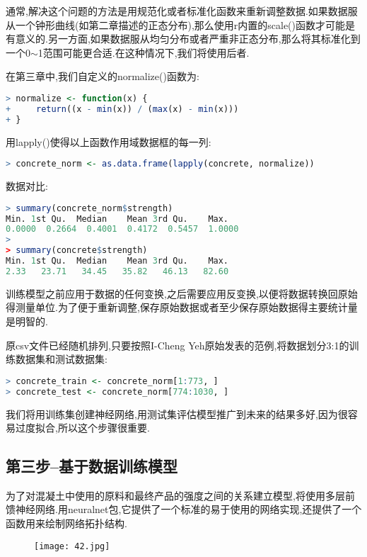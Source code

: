 \documentclass[11pt,a4paper,oneside]{book}
\begin{document}
通常,解决这个问题的方法是用规范化或者标准化函数来重新调整数据.如果数据服从一个钟形曲线(如第二章描述的正态分布),那么使用r内置的scale()函数才可能是有意义的.另一方面,如果数据服从均匀分布或者严重非正态分布,那么将其标准化到一个0$\sim$1范围可能更合适.在这种情况下,我们将使用后者.

在第三章中,我们自定义的normalize()函数为:
\begin{lstlisting}[language=r]
> normalize <- function(x) { 
+     return((x - min(x)) / (max(x) - min(x)))
+ }
\end{lstlisting}
用lapply()使得以上函数作用域数据框的每一列:
\begin{lstlisting}[language=r]
> concrete_norm <- as.data.frame(lapply(concrete, normalize))
\end{lstlisting}
数据对比:
\begin{lstlisting}[language=r]
> summary(concrete_norm$strength)
Min. 1st Qu.  Median    Mean 3rd Qu.    Max. 
0.0000  0.2664  0.4001  0.4172  0.5457  1.0000 
> 
> summary(concrete$strength)
Min. 1st Qu.  Median    Mean 3rd Qu.    Max. 
2.33   23.71   34.45   35.82   46.13   82.60 
\end{lstlisting}
\begin{tcolorbox}[colback=pink!10!white,colframe=pink!100!black]
训练模型之前应用于数据的任何变换,之后需要应用反变换,以便将数据转换回原始得测量单位.为了便于重新调整,保存原始数据或者至少保存原始数据得主要统计量是明智的.
\end{tcolorbox}

原csv文件已经随机排列,只要按照I-Cheng Yeh原始发表的范例,将数据划分3:1的训练数据集和测试数据集:
\begin{lstlisting}[language=r]
> concrete_train <- concrete_norm[1:773, ]
> concrete_test <- concrete_norm[774:1030, ]
\end{lstlisting}
我们将用训练集创建神经网络,用测试集评估模型推广到未来的结果多好,因为很容易过度拟合,所以这个步骤很重要.

\subsection{第三步--基于数据训练模型}
为了对混凝土中使用的原料和最终产品的强度之间的关系建立模型,将使用多层前馈神经网络.用neuralnet包,它提供了一个标准的易于使用的网络实现,还提供了一个函数用来绘制网络拓扑结构.

\begin{figure}[H]
	\centering
	\texttt{[image: 42.jpg]}
\end{figure}
\end{document}
